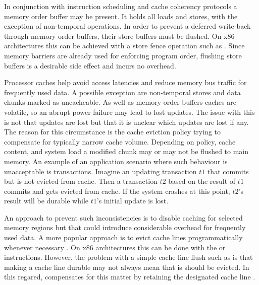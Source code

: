 
In conjunction with instruction scheduling and cache coherency protocols a
memory order buffer may be present. It holds all loads and stores, with the
exception of non-temporal operations. In order to prevent a deferred write-back
through memory order buffers, their store buffers must be flushed. On x86
architectures this can be achieved with a store fence operation such as
. Since memory barriers are already used for enforcing program
order, flushing store buffers is a desirable side effect and incurs no overhead.


Processor caches help avoid access latencies and reduce memory bus traffic for
frequently used data. A possible exception are non-temporal stores and data
chunks marked as uncacheable. As well as memory order buffers caches are
volatile, so an abrupt power failure may lead to lost updates. The issue with
this is not that updates are lost but that it is unclear which updates are lost
if any. The reason for this circumstance is the cache eviction policy trying to
compensate for typically narrow cache volume. Depending on policy, cache
content, and system load a modified chunk may or may not be flushed to main
memory. An example of an application scenario where such behaviour is
unacceptable is transactions. Imagine an updating transaction $t1$ that commits
but is not evicted from cache. Then a transaction $t2$ based on the result of
$t1$ commits and gets evicted from cache. If the system crashes at this point,
$t2$'s result will be durable while $t1$'s initial update is lost.


An approach to prevent such inconsistencies is to disable caching for selected
memory regions but that could introduce considerable overhead for frequently
used data. A more popular approach is to evict cache lines programmatically
whenever necessary \cite{condit2009better, dulloor2014system, oukid2017data}. On
x86 architectures this can be done with the  or 
instructions. However, the problem with a simple cache line flush such as
 is that making a cache line durable may not always mean that is
should be evicted. In this regared,  compensates for this matter by
retaining the designated cache line \cite{kolli2016high}.


